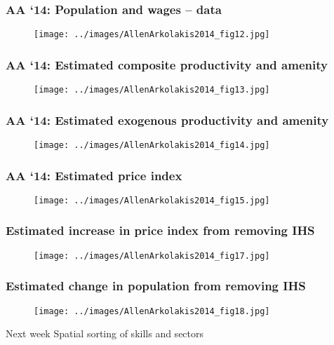 \documentclass[10pt,notes=hide]{beamer}
\begin{document}
\begin{frame}
\frametitle{AA `14: Population and wages -- data}
\begin{figure}[htbp] \centering
\texttt{[image: ../images/AllenArkolakis2014\_fig12.jpg]}
\end{figure}
\end{frame}
\begin{frame}
\frametitle{AA `14: Estimated composite productivity and amenity}
\begin{figure}[htbp] \centering
\texttt{[image: ../images/AllenArkolakis2014\_fig13.jpg]}
\end{figure}
\end{frame}
\begin{frame}
\frametitle{AA `14: Estimated exogenous productivity and amenity}
\begin{figure}[htbp] \centering
\texttt{[image: ../images/AllenArkolakis2014\_fig14.jpg]}
\end{figure}
\end{frame}
\begin{frame}
\frametitle{AA `14: Estimated price index}
\begin{figure}[htbp] \centering
\texttt{[image: ../images/AllenArkolakis2014\_fig15.jpg]}
\end{figure}
\end{frame}
\begin{frame}
\frametitle{Estimated increase in price index from removing IHS}
\begin{figure}[htbp] \centering
\texttt{[image: ../images/AllenArkolakis2014\_fig17.jpg]}
\end{figure}
\end{frame}
\begin{frame}
\frametitle{Estimated change in population from removing IHS}
\begin{figure}[htbp] \centering
\texttt{[image: ../images/AllenArkolakis2014\_fig18.jpg]}
\end{figure}
\end{frame}
\begin{frame}{Next week}
Spatial sorting of skills and sectors
\end{frame}
\end{document}
